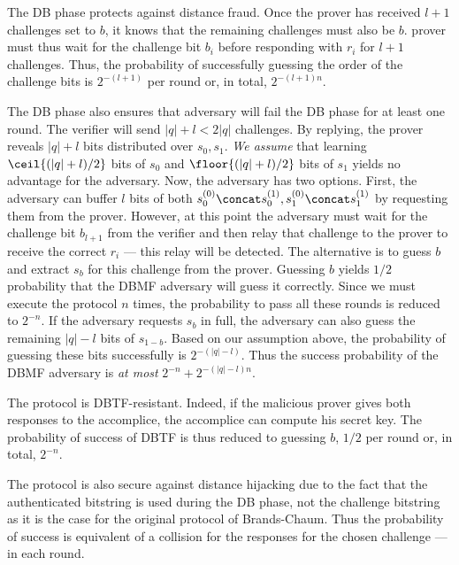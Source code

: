 The \ac{DB} phase protects against distance fraud.
Once the prover has received \(l+1\) challenges set to \(b\), it knows that the remaining challenges must also be \(b\).
 prover must thus wait for the challenge bit \(b_i\) before responding with \(r_i\) for \(l+1\) challenges.
Thus, the probability of successfully guessing the order of the challenge bits is \(2^{-(l+1)}\) per round or, in total, \(2^{-(l+1)n}\).

The \ac{DB} phase also ensures that  adversary will fail the \ac{DB} phase for at least one round.
The verifier will send \(|q| + l < 2|q|\) challenges.
By replying, the prover reveals \(|q|+l\) bits distributed over \(s_0, 
  s_1\).
\emph{We assume} that learning \(\ceil{(|q|+l)/2}\) bits of \(s_0\) and 
\(\floor{(|q|+l)/2}\) bits of \(s_1\) yields no advantage for the adversary.
Now, the adversary has two options.
First, the adversary can buffer \(l\) bits of both \(s_0^{(0)}\concat s_0^{(1)}, s_1^{(0)}\concat s_1^{(1)}\) by requesting them from the prover.
However, at this point the adversary must wait for the challenge bit \(b_{l+1}\) from the verifier and then relay that challenge to the prover to receive the correct \(r_i\) --- this relay will be detected.
The alternative is to guess \(b\) and extract \(s_b\) for this challenge from the prover.
Guessing \(b\) yields \(1/2\) probability that the \ac{DBMF} adversary will guess it correctly.
Since we must execute the protocol \(n\) times, the probability to pass all these rounds is reduced to \(2^{-n}\).
If the adversary requests \(s_b\) in full, the adversary can also guess the 
remaining \(|q|-l\) bits of \(s_{1-b}\).
Based on our assumption above, the probability of guessing these bits 
successfully is \(2^{-(|q|-l)}\).
Thus the success probability of the \ac{DBMF} adversary is \emph{at most} 
\(2^{-n}+2^{-(|q|-l)n}\).

The protocol is \ac{DBTF}-resistant. 
Indeed, if the malicious prover gives both responses to the accomplice, the accomplice can compute his secret key.
The probability of success of \ac{DBTF} is thus reduced to guessing \(b\), \ie \(1/2\) per round or, in total, \(2^{-n}\).

The protocol is also secure against distance hijacking due to the fact that the authenticated bitstring is used during the \ac{DB} phase, not the challenge bitstring as it is the case for the original protocol of Brands-Chaum.
Thus the probability of success is equivalent of a collision for the responses 
for the chosen challenge --- in each round.

